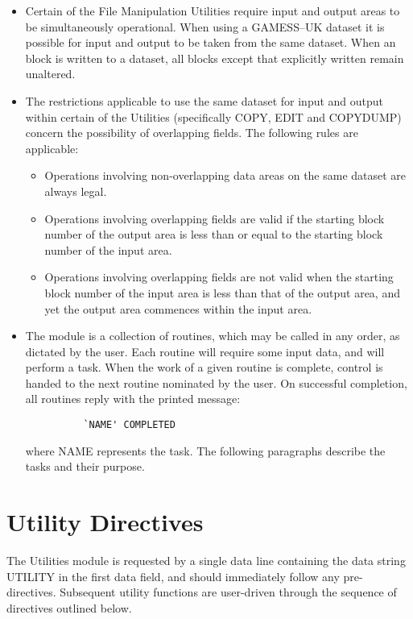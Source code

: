 \documentclass[11pt,fleqn]{article}
\begin{document}
\begin{itemize}

\item  Certain of the File Manipulation  Utilities  
require input and output areas
to be simultaneously operational. When using a GAMESS--UK dataset it is
possible for input and output to be taken from the same dataset.
When an  block is written to a dataset, all blocks except that
explicitly written remain unaltered.
\item  The restrictions applicable to use the same dataset for input and
output within certain of the Utilities (specifically
COPY, EDIT and COPYDUMP) concern the possibility of overlapping
fields. The following rules are applicable:
\begin{itemize}
\item Operations involving non-overlapping data areas 
on the same dataset are always legal.
\item Operations involving overlapping fields are valid if the starting
block number of the output area is less than or equal to the
starting block number of the input area.
\item Operations involving overlapping fields are not valid when the
starting block number of the input area is less than that of the
output area, and yet the output area commences within the input area.
\end{itemize}
\item The module is a collection of routines, which may be called in any
order, as dictated by the user. Each routine will require some input
data, and will perform a task. When the work of a given routine is
complete, control is handed to the next routine nominated by the user.
On successful completion, all routines reply with the printed message:

{
\footnotesize
\begin{verbatim}
          `NAME' COMPLETED
\end{verbatim}
}
where NAME represents the task. The following paragraphs describe the
tasks and their purpose.
\end{itemize}

\section{Utility Directives}

The Utilities module is requested by a single data line
containing the data string UTILITY in the first data field, and
should immediately follow any pre-directives. Subsequent utility
functions are user-driven through the sequence of directives
outlined below.
\end{document}
